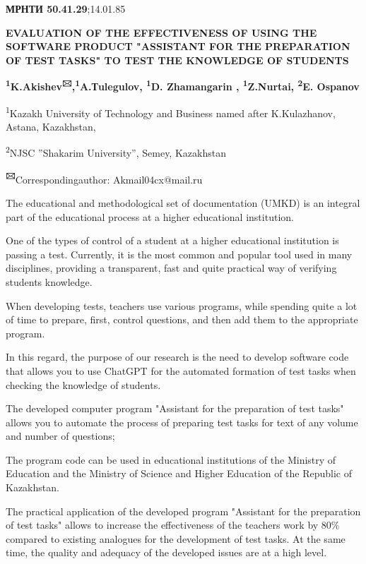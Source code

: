 {\bfseries МРНТИ 50.41.29};14.01.85

{\bfseries EVALUATION OF THE EFFECTIVENESS OF USING THE SOFTWARE PRODUCT
"ASSISTANT FOR THE PREPARATION OF TEST TASKS" TO TEST THE KNOWLEDGE OF
STUDENTS}

{\bfseries \textsuperscript{1}K.Akishev\textsuperscript{🖂},\textsuperscript{1}A.Тulegulov,
\textsuperscript{1}D. Zhamangarin , \textsuperscript{1}Z.Nurtai,
\textsuperscript{2}E. Ospanov}

\textsuperscript{1}Kazakh University of Technology and Business named
after K.Kulazhanov, Astana, Kazakhstan,

\textsuperscript{2}NJSC ''Shakarim University'', Semey, Kazakhstan

{\bfseries \textsuperscript{🖂}}Correspondingauthor: Akmail04cx@mail.ru

The educational and methodological set of documentation (UMKD) is an
integral part of the educational process at a higher educational
institution.

One of the types of control of a student at a higher educational
institution is passing a test. Currently, it is the most common and
popular tool used in many disciplines, providing a transparent, fast and
quite practical way of verifying students\textquotesingle{} knowledge.

When developing tests, teachers use various programs, while spending
quite a lot of time to prepare, first, control questions, and then add
them to the appropriate program.

In this regard, the purpose of our research is the need to develop
software code that allows you to use ChatGPT for the automated formation
of test tasks when checking the knowledge of students.

The developed computer program "Assistant for the preparation of test
tasks" allows you to automate the process of preparing test tasks for
text of any volume and number of questions;

The program code can be used in educational institutions of the Ministry
of Education and the Ministry of Science and Higher Education of the
Republic of Kazakhstan.

The practical application of the developed program "Assistant for the
preparation of test tasks" allows to increase the effectiveness of the
teacher\textquotesingle s work by 80\% compared to existing analogues
for the development of test tasks. At the same time, the quality and
adequacy of the developed issues are at a high level.

